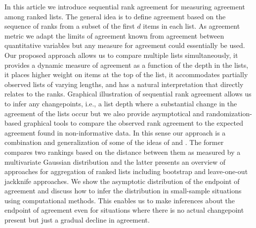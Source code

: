 \documentclass[oupdraft]{bio}
\begin{document}
In this article we introduce sequential rank agreement for measuring
agreement among  ranked lists.  The general idea is to
define agreement based on the sequence of ranks from a subset of the first $d$
items in each list. As agreement metric we adapt the limits of
agreement known from agreement between quantitative variables
\citep{alt:bland:1983,Carstensen2010} but any measure for agreement
could essentially be used. Our proposed approach allows us to
compare multiple lists simultaneously, it provides a dynamic
measure of agreement as a function of the depth in the lists, it places
higher weight on items at the top of the list, it accommodates partially
observed lists of varying lengths, and has a natural interpretation
that directly relates to the ranks.  Graphical illustration of
sequential rank agreement allows us to infer any
changepoints, i.e., a list depth where a substantial change in the agreement of
the lists occur but we also provide asymptotical and randomization-based graphical
tools to compare the observed rank agreement to the expected agreement
found in non-informative data.  In this sense our approach is a
combination and generalization of some of the ideas of
\citet{Carterette2009} and \citet{Boulesteix2009}. The former compares
two rankings based on the distance between them as measured by a
multivariate Gaussian distribution and the latter presents an overview
of approaches for aggregation of ranked lists including bootstrap and
leave-one-out jackknife approaches. We show the asymptotic
distribution of the endpoint of agreement and discuss how to infer the
distribution in small-sample situations using computational
methods. This enables us to make inferences about the endpoint of
agreement even for situations where there is no actual changepoint
present but just a gradual decline in agreement.




\end{document}
